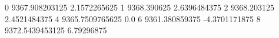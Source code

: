 0 9367.908203125 2.1572265625
1 9368.390625 2.6396484375
2 9368.203125 2.4521484375
4 9365.7509765625 0.0
6 9361.380859375 -4.3701171875
8 9372.5439453125 6.79296875
